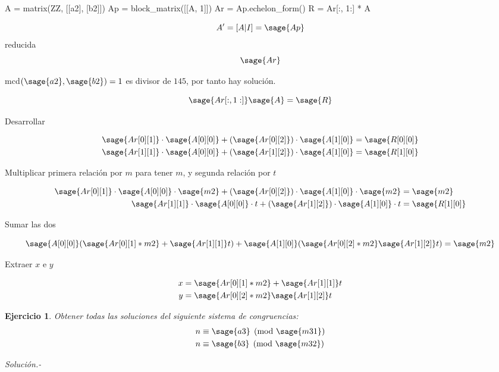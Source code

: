 \documentclass{amsart}
\newtheorem{ejer}{Ejercicio}
\begin{document}


\begin{sageblock}
	A = matrix(ZZ, [[a2], [b2]])
	Ap = block_matrix([[A, 1]])
	Ar = Ap.echelon_form()
	R = Ar[:, 1:] * A
\end{sageblock}

$$
	A' = [A|I] = \sage{Ap}
$$
reducida
$$
	\sage{Ar}
$$

mcd$(\sage{a2}, \sage{b2}) = 1$ es divisor de $145$, por tanto hay solución.

$$
	\sage{Ar[:, 1:]} \sage{A} = \sage{R}
$$

Desarrollar

\begin{align*}
	\sage{Ar[0][1]} \cdot \sage{A[0][0]} + (\sage{Ar[0][2]}) \cdot \sage{A[1][0]} &= \sage{R[0][0]} \\
	\sage{Ar[1][1]} \cdot \sage{A[0][0]} + (\sage{Ar[1][2]}) \cdot \sage{A[1][0]} &= \sage{R[1][0]} \\
\end{align*}

Multiplicar primera relación por $m$ para tener $m$, y segunda relación por $t$

\begin{align*}
	\sage{Ar[0][1]} \cdot \sage{A[0][0]} \cdot \sage{m2} + (\sage{Ar[0][2]}) \cdot \sage{A[1][0]} \cdot \sage{m2} &= \sage{m2} \\
	\sage{Ar[1][1]} \cdot \sage{A[0][0]} \cdot t + (\sage{Ar[1][2]}) \cdot \sage{A[1][0]} \cdot t &= \sage{R[1][0]} \\
\end{align*}

Sumar las dos

$$
	\sage{A[0][0]} (\sage{Ar[0][1] * m2} + \sage{Ar[1][1]} t) + \sage{A[1][0]} (\sage{Ar[0][2] * m2}  \sage{Ar[1][2]}t) = \sage{m2}
$$

Extraer $x$ e $y$

\begin{align*}
	x &= \sage{Ar[0][1] * m2} + \sage{Ar[1][1]} t \\
	y &= \sage{Ar[0][2] * m2}  \sage{Ar[1][2]}t \\
\end{align*}


\vskip 1cm

\begin{ejer} Obtener todas las soluciones del siguiente sistema de congruencias:
\begin{align*}
n &\equiv \sage{a3} \pmod{\sage{m31}} \\
n &\equiv \sage{b3} \pmod{\sage{m32}} \\
\end{align*}
\end{ejer}
{\it Solución.-} 
\end{document}
